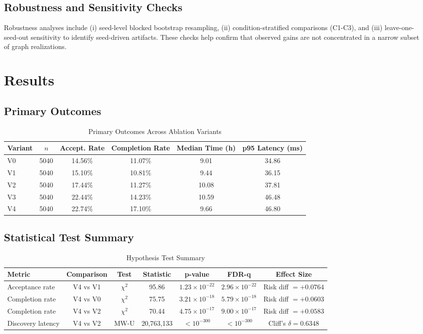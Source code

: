 \documentclass[conference]{IEEEtran}
\begin{document}
\subsection{Robustness and Sensitivity Checks}
Robustness analyses include (i) seed-level blocked bootstrap resampling, (ii) condition-stratified comparisons (C1-C3), and (iii) leave-one-seed-out sensitivity to identify seed-driven artifacts. These checks help confirm that observed gains are not concentrated in a narrow subset of graph realizations.

\section{Results}
\subsection{Primary Outcomes}
\begin{table}[htbp]
\caption{Primary Outcomes Across Ablation Variants}
\label{tab:primary_outcomes}
\centering
\begin{tabular}{lccccc}
\toprule
Variant & $n$ & Accept. Rate & Completion Rate & Median Time (h) & p95 Latency (ms) \\
\midrule
V0 & 5040 & 14.56\% & 11.07\% & 9.01 & 34.86 \\
V1 & 5040 & 15.10\% & 10.81\% & 9.44 & 36.15 \\
V2 & 5040 & 17.44\% & 11.27\% & 10.08 & 37.81 \\
V3 & 5040 & 22.44\% & 14.23\% & 10.59 & 46.48 \\
V4 & 5040 & 22.74\% & 17.10\% & 9.66 & 46.80 \\
\bottomrule
\end{tabular}
\end{table}

\subsection{Statistical Test Summary}
\begin{table}[htbp]
\caption{Hypothesis Test Summary}
\label{tab:stats_summary}
\centering
\begin{tabular}{lcccccc}
\toprule
Metric & Comparison & Test & Statistic & p-value & FDR-q & Effect Size \\
\midrule
Acceptance rate & V4 vs V1 & $\chi^2$ & 95.86 & $1.23\times10^{-22}$ & $2.96\times10^{-22}$ & Risk diff $=+0.0764$ \\
Completion rate & V4 vs V0 & $\chi^2$ & 75.75 & $3.21\times10^{-18}$ & $5.79\times10^{-18}$ & Risk diff $=+0.0603$ \\
Completion rate & V4 vs V2 & $\chi^2$ & 70.44 & $4.75\times10^{-17}$ & $9.00\times10^{-17}$ & Risk diff $=+0.0583$ \\
Discovery latency & V4 vs V2 & MW-U & 20,763,133 & $<10^{-300}$ & $<10^{-300}$ & Cliff's $\delta=0.6348$ \\
\bottomrule
\end{tabular}
\end{table}
\end{document}
